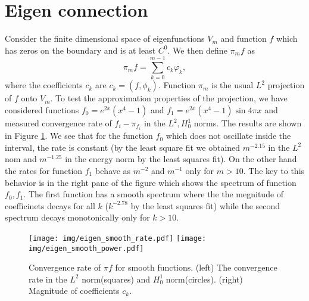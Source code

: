 \documentclass[a4paper,10pt]{article}
\newcommand{\inner}[2]{\ensuremath{\left(#1, #2\right)}}
\begin{document}
  \section{Eigen connection}
  Consider the finite dimensional space of eigenfunctions $V_m$ and function $f$
  which has zeros on the boundary and is at least $C^0$. We then define $\pi_m f$
  as
  \[
    \pi_m f = \displaystyle\sum\limits_{k=0}^{m-1}c_k \varphi_k,
  \]
  where the coefficients $c_k$ are $c_k=\inner{f}{\phi_k}$. Function $\pi_m$ is
  the usual $L^2$ projection of $f$ onto $V_m$. To test the approximation
  properties of the projection, we have considered functions
  $f_0=e^{2x}(x^4-1)$ and $f_1=e^{2x}(x^4-1)\sin{4\pi x}$ and measured
  convergence rate of $f_i - \pi_{f_i}$ in the $L^2, H^1_0$ norms. The results
  are shown in Figure \ref{fig:eig_smooth_projection}. We see that for the
  function $f_0$ which does not oscillate inside the interval, the rate is constant
  (by the least square fit we obtained $m^{-2.15}$ in the $L^2$ nom and $m^{-1.25}$
  in the energy norm by the least squares fit). On the other hand the rates
  for function $f_1$ behave as $m^{-2}$ and $m^{-1}$ only for $m>10$. The key
  to this behavior is in the right pane of the figure which shows the spectrum
  of function $f_0, f_1$. The first function has a smooth spectrum where the the
  megnitude of coefficinets decays for all $k$ ($k^{-2.78}$ by the least squares
  fit) while the second spectrum decays monotonically only for $k>10$.
  \begin{figure}
  \begin{center}
    \texttt{[image: img/eigen\_smooth\_rate.pdf]}
    \texttt{[image: img/eigen\_smooth\_power.pdf]}
  \end{center}
  \label{fig:eig_smooth_projection}
  \caption{Convergence rate of $\pi f$ for smooth functions. (left) The
  convergence rate in the $L^2$ norm(squares) and $H^1_0$ norm(circles). 
  (right) Magnitude of coefficients $c_k$.}
  \end{figure}
\end{document}
